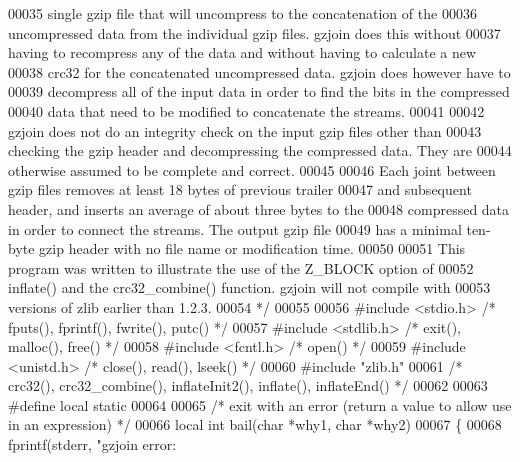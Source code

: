 \begin{DoxyCode}
00035 \textcolor{comment}{   single gzip file that will uncompress to the concatenation of the}
00036 \textcolor{comment}{   uncompressed data from the individual gzip files.  gzjoin does this without}
00037 \textcolor{comment}{   having to recompress any of the data and without having to calculate a new}
00038 \textcolor{comment}{   crc32 for the concatenated uncompressed data.  gzjoin does however have to}
00039 \textcolor{comment}{   decompress all of the input data in order to find the bits in the compressed}
00040 \textcolor{comment}{   data that need to be modified to concatenate the streams.}
00041 \textcolor{comment}{}
00042 \textcolor{comment}{   gzjoin does not do an integrity check on the input gzip files other than}
00043 \textcolor{comment}{   checking the gzip header and decompressing the compressed data.  They are}
00044 \textcolor{comment}{   otherwise assumed to be complete and correct.}
00045 \textcolor{comment}{}
00046 \textcolor{comment}{   Each joint between gzip files removes at least 18 bytes of previous trailer}
00047 \textcolor{comment}{   and subsequent header, and inserts an average of about three bytes to the}
00048 \textcolor{comment}{   compressed data in order to connect the streams.  The output gzip file}
00049 \textcolor{comment}{   has a minimal ten-byte gzip header with no file name or modification time.}
00050 \textcolor{comment}{}
00051 \textcolor{comment}{   This program was written to illustrate the use of the Z\_BLOCK option of}
00052 \textcolor{comment}{   inflate() and the crc32\_combine() function.  gzjoin will not compile with}
00053 \textcolor{comment}{   versions of zlib earlier than 1.2.3.}
00054 \textcolor{comment}{ */}
00055 
00056 \textcolor{preprocessor}{#include <stdio.h>}      \textcolor{comment}{/* fputs(), fprintf(), fwrite(), putc() */}
00057 \textcolor{preprocessor}{#include <stdlib.h>}     \textcolor{comment}{/* exit(), malloc(), free() */}
00058 \textcolor{preprocessor}{#include <fcntl.h>}      \textcolor{comment}{/* open() */}
00059 \textcolor{preprocessor}{#include <unistd.h>}     \textcolor{comment}{/* close(), read(), lseek() */}
00060 \textcolor{preprocessor}{#include "zlib.h"}
00061     \textcolor{comment}{/* crc32(), crc32\_combine(), inflateInit2(), inflate(), inflateEnd() */}
00062 
00063 \textcolor{preprocessor}{#define local static}
00064 
00065 \textcolor{comment}{/* exit with an error (return a value to allow use in an expression) */}
00066 local \textcolor{keywordtype}{int} bail(\textcolor{keywordtype}{char} *why1, \textcolor{keywordtype}{char} *why2)
00067 \{
00068     fprintf(stderr, \textcolor{stringliteral}{"gzjoin error: %
}
\end{DoxyCode}
